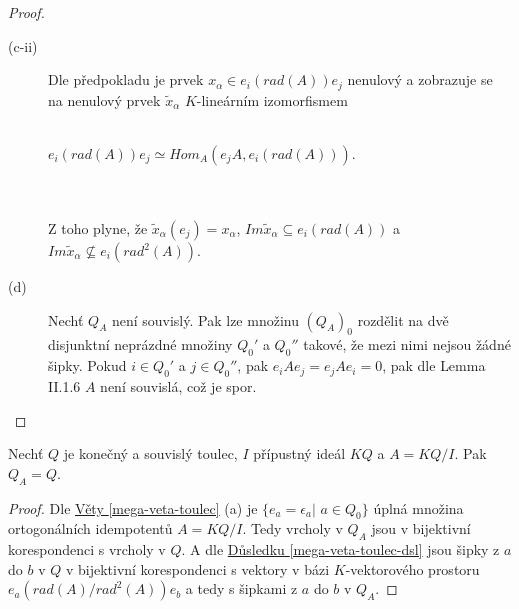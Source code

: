 \begin{proof}
\begin{description}
        \item[(c-ii)] Dle předpokladu je prvek $x_\alpha\in e_i(rad(A))e_j$ 
          nenulový a zobrazuje se na nenulový prvek $\tilde x_\alpha$ 
          $K$-lineárním izomorfismem \\\\
          \centerline{$e_i(rad(A))e_j\simeq Hom_A(e_j A,e_i(rad(A)))$.} \\\\
          Z toho plyne, že $\tilde x_\alpha(e_j)=x_\alpha$, $Im \tilde x_\alpha\subseteq e_i(rad(A))$ 
          a $Im \tilde x_\alpha\not\subseteq e_i(rad^2(A))$.
        
        \item[(d)] Nechť $Q_A$ není souvislý. Pak lze množinu $(Q_A)_0$ rozdělit na 
          dvě disjunktní neprázdné množiny $Q_0'$ a $Q_0''$ takové, že mezi nimi 
          nejsou žádné šipky. Pokud $i\in Q_0'$ a $j\in Q_0''$, pak 
          $e_iAe_j=e_jAe_i=0$, pak dle \cite{1} Lemma II.1.6 $A$ 
          není souvislá, což je spor.
        
      \end{description}
    \end{proof}
    
    \begin{lem}
      Nechť $Q$ je konečný a souvislý toulec, $I$ přípustný ideál $KQ$ a $A=KQ/I$. 
      Pak $Q_A=Q$.
    \end{lem}
    
    \begin{proof}
      Dle \hyperref[mega-veta-toulec]{Věty \ref*{mega-veta-toulec}} (a) 
      je $\{e_a=\epsilon_a|$ $a\in Q_0\}$ úplná množina ortogonálních 
      idempotentů $A=KQ/I$. Tedy vrcholy v $Q_A$ jsou v bijektivní korespondenci 
      s vrcholy v $Q$. 
      A dle \hyperref[mega-veta-toulec-dsl]{Důsledku \ref*{mega-veta-toulec-dsl}} 
      jsou šipky z $a$ do $b$ v $Q$ v bijektivní korespondenci s vektory v bázi 
      $K$-vektorového prostoru $e_a(rad(A)/rad^2(A))e_b$  a tedy s šipkami z $a$ do $b$ v $Q_A$.
    \end{proof}
    

